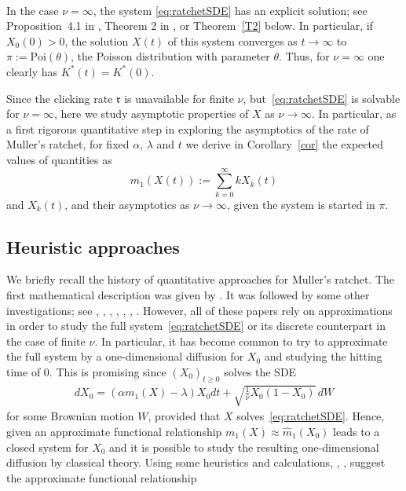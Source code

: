 \documentclass{imsart}
\theoremstyle{plain}
\theoremstyle{definition}
\begin{document}
~

In the case $\nu=\infty$, the system \eqref{eq:ratchetSDE} has an explicit solution; see Proposition~4.1 in \cite{EtheridgePfaffelhuberWakolbinger2007}, Theorem 2 in \cite{pfaffelhuber2012muller}, or Theorem~\ref{T2} below. In particular, if $X_0(0)>0$, the solution $X(t)$ of this system converges as $t\to \infty$ to $\pi := \text{Poi}(\theta)$, the Poisson distribution with parameter $\theta$. Thus, for $\nu=\infty$ one clearly has $K^\ast (t) = K^\ast (0)$.

Since the clicking rate $\mathfrak r$ is unavailable for finite $\nu$, but~\eqref{eq:ratchetSDE} is solvable for $\nu=\infty$, here we study asymptotic properties of $X$ as $\nu\to \infty$. In particular, as a first rigorous quantitative step in exploring the asymptotics of the rate of Muller's ratchet, for fixed $\alpha$, $\lambda$  and $t$  we derive in Corollary~\ref{cor} the expected values of quantities as 
$$m_1(X(t)) := \sum_{k=0}^\infty k X_k(t)$$ 
and $X_k(t)$,  and their asymptotics as $\nu \to\infty$, given the system is started in $\pi$. \subsection{Heuristic approaches}
We briefly recall the history of quantitative approaches for Muller's ratchet.  The first mathematical description was given by \cite{Haigh1978}. It was followed by some other investigations; see \cite{StephanChaoSmale1993}, \cite{Gessler1995}, \cite{HiggsWoodcock1995}, \cite{GordoCharlesworth2000}, \cite{RouzineWakeleyCoffin2003}, \cite{EtheridgePfaffelhuberWakolbinger2007}, \cite{pmid18689884}.
However, all of these papers rely on approximations in order to study the full system~\eqref{eq:ratchetSDE} or its discrete counterpart in the case of finite $\nu$. In particular, it has become common to try to approximate the full system by a one-dimensional diffusion for $X_0$ and studying the hitting time of 0. This is promising since $(X_0)_{t\geq 0}$ solves the SDE
\begin{align}
\label{eq:dX0}
dX_0 = (\alpha m_1(X) - \lambda )X_0 dt + \sqrt{\frac 1{\nu} X_0(1-X_0)}\, dW
\end{align}
for some Brownian motion $W$, provided that $X$ solves~\eqref{eq:ratchetSDE}.  Hence, given an approximate functional relationship $m_1(X) \approx \widehat m_1(X_0)$ leads to a closed system for $X_0$ and it is possible to study the resulting one-dimensional diffusion by classical theory. Using some heuristics and calculations, \cite{StephanChaoSmale1993}, \cite{CharlesworthCharlesworth1997}, \cite{EtheridgePfaffelhuberWakolbinger2007} suggest the approximate functional relationship
\end{document}
